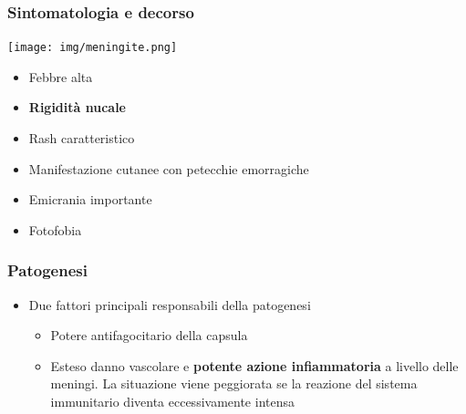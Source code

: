 \documentclass[italian,]{article}
\providecommand{\tightlist}{%
  \setlength{\itemsep}{0pt}\setlength{\parskip}{0pt}}
\begin{document}
\hypertarget{sintomatologia-e-decorso}{%
\subsubsection{Sintomatologia e
decorso}\label{sintomatologia-e-decorso}}

\texttt{[image: img/meningite.png]}~

\begin{itemize}
\tightlist
\item
  Febbre alta
\item
  \textbf{Rigidità nucale}
\item
  Rash caratteristico
\item
  Manifestazione cutanee con petecchie emorragiche
\item
  Emicrania importante
\item
  Fotofobia
\end{itemize}

\hypertarget{patogenesi-4}{%
\subsubsection{Patogenesi}\label{patogenesi-4}}

\begin{itemize}
\tightlist
\item
  Due fattori principali responsabili della patogenesi

  \begin{itemize}
  \tightlist
  \item
    Potere antifagocitario della capsula
  \item
    Esteso danno vascolare e \textbf{potente azione infiammatoria} a
    livello delle meningi. La situazione viene peggiorata se la reazione
    del sistema immunitario diventa eccessivamente intensa
  \end{itemize}
\end{itemize}
\end{document}
